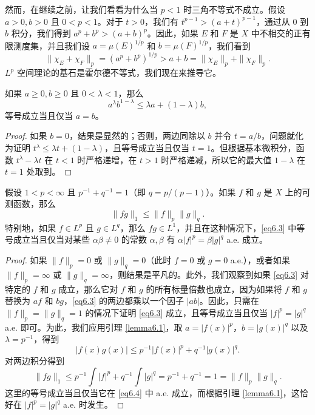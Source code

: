 \documentclass[lang=cn,10pt,thmcnt=section]{elegantbook}
\begin{document}
然而，在继续之前，让我们看看为什么当 $p < 1$ 时三角不等式不成立。假设 $a>0, b>0$ 且 $0<p<1$。对于 $t>0$，我们有 $t^{p-1} > (a+t)^{p-1}$，通过从 $0$ 到 $b$ 积分，我们得到 $a^p + b^p > (a+b)^p$。因此，如果 $E$ 和 $F$ 是 $X$ 中不相交的正有限测度集，并且我们设 $a = \mu(E)^{1/p}$ 和 $b = \mu(F)^{1/p}$，我们看到
\[ \|\chi_E + \chi_F\|_p = (a^p + b^p)^{1/p} > a+b = \|\chi_E\|_p + \|\chi_F\|_p. \]
$L^p$ 空间理论的基石是霍尔德不等式，我们现在来推导它。

\begin{lemma}\label{lemma6.1}
如果 $a \ge 0, b \ge 0$ 且 $0 < \lambda < 1$，那么
\[ a^\lambda b^{1-\lambda} \le \lambda a + (1-\lambda)b, \]
等号成立当且仅当 $a=b$。
\end{lemma}

\begin{proof}
如果 $b=0$，结果是显然的；否则，两边同除以 $b$ 并令 $t=a/b$，问题就化为证明 $t^\lambda \le \lambda t + (1-\lambda)$，且等号成立当且仅当 $t=1$。但根据基本微积分，函数 $t^\lambda - \lambda t$ 在 $t<1$ 时严格递增，在 $t>1$ 时严格递减，所以它的最大值 $1-\lambda$ 在 $t=1$ 处取到。
\end{proof}

\begin{theorem}[霍尔德不等式]\label{theorem6.2}
假设 $1 < p < \infty$ 且 $p^{-1} + q^{-1} = 1$（即 $q=p/(p-1)$）。如果 $f$ 和 $g$ 是 $X$ 上的可测函数，那么
\begin{equation}\label{eq6.3}
\|fg\|_1 \le \|f\|_p\|g\|_q.
\end{equation}
特别地，如果 $f \in L^p$ 且 $g \in L^q$，那么 $fg \in L^1$，并且在这种情况下，\eqref{eq6.3} 中等号成立当且仅当对某些 $\alpha\beta \ne 0$ 的常数 $\alpha, \beta$ 有 $\alpha|f|^p = \beta|g|^q$ a.e. 成立。
\end{theorem}

\begin{proof}
如果 $\|f\|_p = 0$ 或 $\|g\|_q = 0$（此时 $f=0$ 或 $g=0$ a.e.），或者如果 $\|f\|_p = \infty$ 或 $\|g\|_q = \infty$，则结果是平凡的。此外，我们观察到如果 \eqref{eq6.3} 对特定的 $f$ 和 $g$ 成立，那么它对 $f$ 和 $g$ 的所有标量倍数也成立，因为如果将 $f$ 和 $g$ 替换为 $af$ 和 $bg$，\eqref{eq6.3} 的两边都乘以一个因子 $|ab|$。因此，只需在 $\|f\|_p = \|g\|_q = 1$ 的情况下证明 \eqref{eq6.3} 成立，且等号成立当且仅当 $|f|^p=|g|^q$ a.e. 即可。为此，我们应用引理 \ref{lemma6.1}，取 $a = |f(x)|^p$，$b=|g(x)|^q$ 以及 $\lambda=p^{-1}$，得到
\begin{equation}\label{eq6.4}
|f(x)g(x)| \le p^{-1}|f(x)|^p + q^{-1}|g(x)|^q.
\end{equation}
对两边积分得到
\[ \|fg\|_1 \le p^{-1}\int|f|^p + q^{-1}\int|g|^q = p^{-1} + q^{-1} = 1 = \|f\|_p\|g\|_q. \]
这里的等号成立当且仅当它在 \eqref{eq6.4} 中 a.e. 成立，而根据引理 \ref{lemma6.1}，这恰好在 $|f|^p = |g|^q$ a.e. 时发生。
\end{proof}
\end{document}
